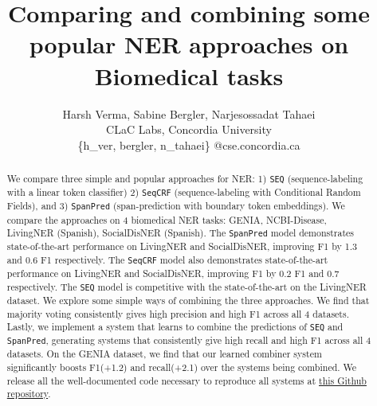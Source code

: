 \documentclass[11pt]{article}
\title{Comparing and combining some popular NER approaches on Biomedical tasks}
\author{Harsh Verma,  Sabine Bergler,  Narjesossadat Tahaei \\
        CLaC Labs, Concordia University \\
        \{h\_ver, bergler, n\_tahaei\} @cse.concordia.ca}
\begin{document}
 
\maketitle 
\begin{abstract}
We compare three simple and popular approaches for NER: 1) \texttt{SEQ} (sequence-labeling with a linear token classifier) 2) \texttt{SeqCRF} (sequence-labeling with Conditional Random Fields), and 3) \texttt{SpanPred} (span-prediction with boundary token embeddings). 
We compare the approaches on 4 biomedical NER tasks: GENIA, NCBI-Disease, LivingNER (Spanish), SocialDisNER (Spanish).
The \texttt{SpanPred} model demonstrates state-of-the-art performance on LivingNER and SocialDisNER, 
improving F1 by 1.3 and 0.6 F1 respectively. 
The \texttt{SeqCRF} model also demonstrates state-of-the-art performance on LivingNER and SocialDisNER, improving F1 by 0.2 F1 and 0.7 respectively.
The \texttt{SEQ} model is competitive with the state-of-the-art on the LivingNER dataset.
We explore some simple ways of combining the three approaches. 
We find that majority voting consistently gives high precision and high F1 across all 4 datasets.
Lastly, we implement a system that learns to combine the predictions of \texttt{SEQ} and \texttt{SpanPred},
generating systems that consistently give high recall and high F1 across all 4 datasets. 
On the GENIA dataset, we find that our learned combiner system significantly 
boosts F1(+1.2) and  recall(+2.1) over the systems being combined. 
We release all the well-documented code necessary to reproduce all systems at  \href{https://github.com/flyingmothman/bionlp}{this Github repository}.
\end{abstract}
\end{document}
